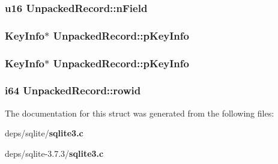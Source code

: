 \subsubsection{\setlength{\rightskip}{0pt plus 5cm}\bf{u16} \bf{Unpacked\-Record::n\-Field}}\label{structUnpackedRecord_1eceacd9c08c164b18e41bf9b88b9780}


\subsubsection{\setlength{\rightskip}{0pt plus 5cm}\bf{Key\-Info}$\ast$ \bf{Unpacked\-Record::p\-Key\-Info}}\label{structUnpackedRecord_1025692aae2294bae8789ab38a1e5233}


\subsubsection{\setlength{\rightskip}{0pt plus 5cm}\bf{Key\-Info}$\ast$ \bf{Unpacked\-Record::p\-Key\-Info}}\label{structUnpackedRecord_1025692aae2294bae8789ab38a1e5233}


\subsubsection{\setlength{\rightskip}{0pt plus 5cm}\bf{i64} \bf{Unpacked\-Record::rowid}}\label{structUnpackedRecord_a6914894db0211791457b7265cb833bb}




The documentation for this struct was generated from the following files:\begin{CompactItemize}
\item 
deps/sqlite/\bf{sqlite3.c}\item 
deps/sqlite-3.7.3/\bf{sqlite3.c}\end{CompactItemize}
